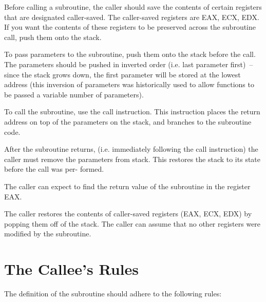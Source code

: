 \begin{numlist}
\item Before calling a subroutine, the caller should save the contents
  of certain registers that are designated caller-saved. The
  caller-saved registers are EAX, ECX, EDX. If you want the contents
  of these registers to be preserved across the subroutine call, push
  them onto the stack.
\item To pass parameters to the subroutine, push them onto the stack
  before the call. The parameters should be pushed in inverted order
  (i.e. last parameter first)~-- since the stack grows down, the first
  parameter will be stored at the lowest address (this inversion of
  parameters was historically used to allow functions to be passed a
  variable number of parameters).
\item To call the subroutine, use the call instruction. This
  instruction places the return address on top of the parameters on
  the stack, and branches to the subroutine code.
\item After the subroutine returns, (i.e. immediately following the
  call instruction) the caller must remove the parameters from stack.
  This restores the stack to its state before the call was per-
  formed.
\item The caller can expect to find the return value of the subroutine
  in the register EAX.
\item The caller restores the contents of caller-saved registers (EAX,
  ECX, EDX) by popping them off of the stack. The caller can assume
  that no other registers were modified by the subroutine.
\end{numlist}

\section{The Callee's Rules}

The definition of the subroutine should adhere to the following rules:

